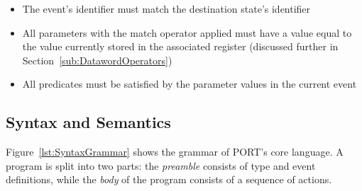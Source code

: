 \begin{itemize}
\item{The event's identifier must match the destination state's identifier}
\item{All parameters with the match operator applied must have a value equal to
  the value currently stored in the associated register (discussed further
    in Section~\ref{sub:DatawordOperators})}
\item{All predicates must be satisfied by the parameter values in the
  current event}
\end{itemize}

\fi


\subsection{Syntax and Semantics}
\label{sub:SyntaxAndSemantics}

Figure~\ref{lst:SyntaxGrammar} shows the grammar of PORT's core language.
A program is split into two parts: the \emph{preamble} consists of type and event definitions, while the \emph{body} of the program  consists of a sequence of actions.

